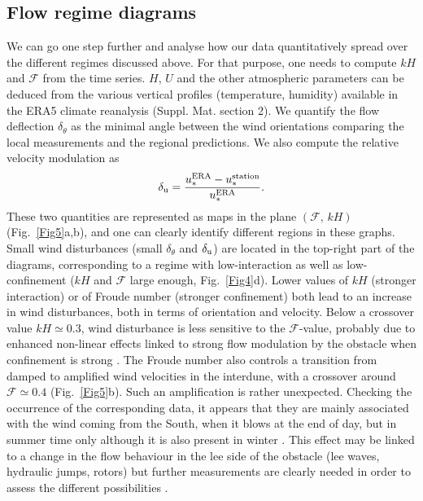 \subsection{Flow regime diagrams}
We can go one step further and analyse how our data quantitatively spread over the different regimes discussed above. For that purpose, one needs to compute $kH$ and $\mathcal{F}$ from the time series. $H$, $U$ and the other atmospheric parameters can be deduced from the various vertical profiles (temperature, humidity) available in the ERA5 climate reanalysis (Suppl. Mat. section 2). We quantify the flow deflection $\delta_{\theta}$ as the minimal angle between the wind orientations comparing the local measurements and the regional predictions. We also compute the relative velocity modulation as
%
\begin{equation}
\delta_{\textup{u}} = \frac{u_{*}^{\textup{ERA}} -  u_{*}^{\textup{station}}}{u_{*}^{\textup{ERA}}}.
\end{equation}
%
These two quantities are represented as maps in the plane $(\mathcal{F}, \, kH)$ (Fig.~\ref{Fig5}a,b), and one can clearly identify different regions in these graphs. Small wind disturbances (small $\delta_{\theta}$ and $\delta_{\textup{u}}$) are located in the top-right part of the diagrams, corresponding to a regime with low-interaction as well as low-confinement ($k H$ and $\mathcal{F}$ large enough, Fig.~\ref{Fig4}d). Lower values of $k H$ (stronger interaction) or of Froude number (stronger confinement) both lead to an increase in wind disturbances, both in terms of orientation and velocity. Below a crossover value $k H \simeq 0.3$, wind disturbance is less sensitive to the $\mathcal{F}$-value, probably due to enhanced non-linear effects linked to strong flow modulation by the obstacle when confinement is strong . The Froude number also controls a transition from damped to amplified wind velocities in the interdune, with a crossover around $\mathcal{F} \simeq 0.4$ (Fig.~\ref{Fig5}b). Such an amplification is rather unexpected. Checking the occurrence of the corresponding data, it appears that they are mainly associated with the wind coming from the South, when it blows at the end of day, but in summer time only although it is also present in winter . This effect may be linked to a change in the flow behaviour in the lee side of the obstacle (lee waves, hydraulic jumps, rotors) but further measurements are clearly needed in order to assess the different possibilities \citep{baines1995, Vosper2004}.


